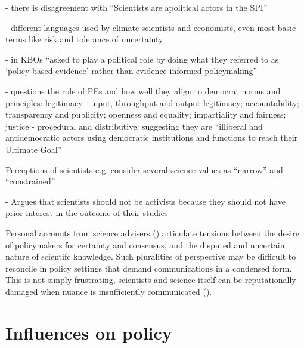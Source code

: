 \cite{JagannathanEtAl2023} - there is disagreement with ``Scientists are apolitical actors in the SPI''

\cite{Makin2024} - different languages used by climate scientists and economists, even most basic terms like risk and tolerance of uncertainty

\cite{MacKillopCDD2023} - in KBOs ``asked to play a political role by doing what they referred to as `policy-based evidence' rather than evidence-informed policymaking''

\cite{vonMalmborg2024strategies} - questions the role of PEs and how well they align to democrat norms and principles: legitimacy - input, throughput and output legitimacy; accountability; transparency and publicity; openness and equality; impartiality and fairness; justice - procedural and distributive; suggesting they are ``illiberal and antidemocratic actors using democratic institutions and functions to reach their Ultimate Goal''

Perceptions of scientists e.g. \cite{McNiePS2017} consider several science values as ``narrow'' and ``constrained''

\cite{Buntgen2024} - Argues that scientists should not be activists because they should not have prior interest in the outcome of their studies

Personal accounts from science advisers (\cite{Stirling2010,Hicks2024}) articulate  tensions between the desire of policymakers for certainty and consensus, and the disputed and uncertain nature of scientifc knowledge. Such pluralities of perspective may be difficult to reconcile in policy settings that demand communications in a condensed form. This is not simply frustrating, scientists and science itself can be reputationally damaged when nuance is insufficiently communicated (\cite{Stirling2010,OjanenBKP2021}). 

\section{Influences on policy}\label{sec:litinfluence}

